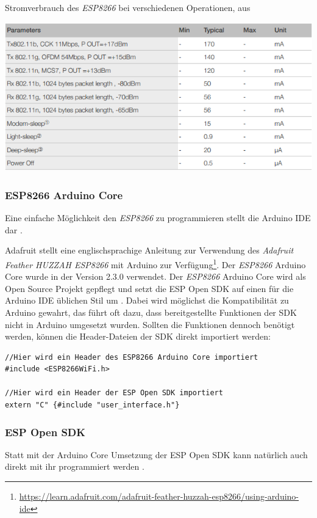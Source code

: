 \begin{table}[h]
  \centering
  \caption{Stromverbrauch des \emph{ESP8266} bei verschiedenen Operationen, aus \cite{espressif2017esp8266}}
	\includegraphics[width=\textwidth]{images/esppower.png}
  \label{table:esppower}
\end{table}


\subsubsection{ESP8266 Arduino Core}
Eine einfache Möglichkeit den \emph{ESP8266} zu programmieren stellt die Arduino IDE dar \cite{banzi2017arduino}.

Adafruit stellt eine englischsprachige Anleitung zur Verwendung des \textit{Adafruit Feather HUZZAH ESP8266} mit Arduino zur Verfügung\footnote{\url{https://learn.adafruit.com/adafruit-feather-huzzah-esp8266/using-arduino-ide}}.
Der \emph{ESP8266} Arduino Core wurde in der Version 2.3.0 verwendet.
Der \emph{ESP8266} Arduino Core wird als Open Source Projekt gepflegt und setzt die ESP Open SDK auf einen für die Arduino IDE üblichen Stil um \cite{arduino2017core}. 
Dabei wird möglichst die Kompatibilität zu Arduino gewahrt, das führt oft dazu, dass bereitgestellte Funktionen der SDK nicht in Arduino umgesetzt wurden.
Sollten die Funktionen dennoch benötigt werden, können die Header-Dateien der SDK direkt importiert werden:

\begin{verbatim}
//Hier wird ein Header des ESP8266 Arduino Core importiert
#include <ESP8266WiFi.h> 

//Hier wird ein Header der ESP Open SDK importiert
extern "C" {#include "user_interface.h"} 
\end{verbatim}

\subsubsection{ESP Open SDK}
Statt mit der Arduino Core Umsetzung der ESP Open SDK kann natürlich auch direkt mit ihr programmiert werden \cite{esp2017open}. 


